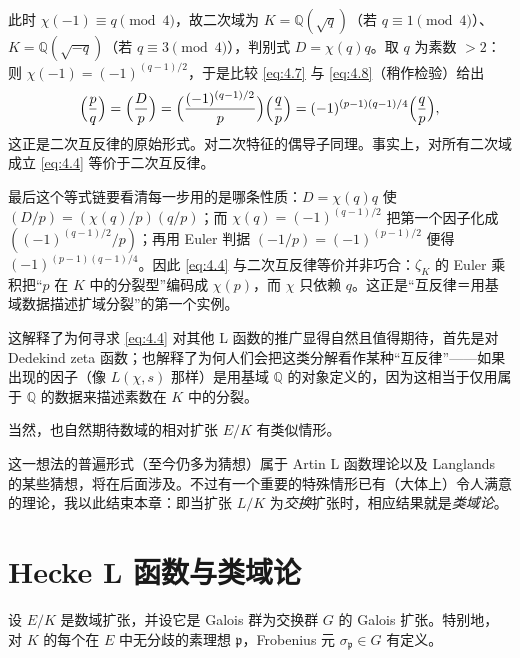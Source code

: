 此时 $\chi(-1)\equiv q\pmod 4$，故二次域为 $K=\mathbb{Q}(\sqrt{q})$（若 $q\equiv 1\pmod 4$）、$K=\mathbb{Q}(\sqrt{-q})$（若 $q\equiv 3\pmod 4$），判别式 $D=\chi(q)q$。取 $q$ 为素数 $>2$：则 $\chi(-1)=(-1)^{(q-1)/2}$，于是比较 \eqref{eq:4.7} 与 \eqref{eq:4.8}（稍作检验）给出
\[
\Bigl(\frac{p}{q}\Bigr)=\Bigl(\frac{D}{p}\Bigr)
=\Bigl(\frac{(-1)^{(q-1)/2}}{p}\Bigr)\Bigl(\frac{q}{p}\Bigr)
=(-1)^{(p-1)(q-1)/4}\Bigl(\frac{q}{p}\Bigr),
\]
这正是二次互反律的原始形式。对二次特征的偶导子同理。事实上，对所有二次域成立 \eqref{eq:4.4} 等价于二次互反律。

\begin{annote}
最后这个等式链要看清每一步用的是哪条性质：$D=\chi(q)q$ 使 $(D/p)=(\chi(q)/p)(q/p)$；而 $\chi(q)=(-1)^{(q-1)/2}$ 把第一个因子化成 $((-1)^{(q-1)/2}/p)$；再用 Euler 判据 $(-1/p)=(-1)^{(p-1)/2}$ 便得 $(-1)^{(p-1)(q-1)/4}$。因此 \eqref{eq:4.4} 与二次互反律等价并非巧合：$\zeta_K$ 的 Euler 乘积把“$p$ 在 $K$ 中的分裂型”编码成 $\chi(p)$，而 $\chi$ 只依赖 $q$。这正是“互反律＝用基域数据描述扩域分裂”的第一个实例。
\par\vspace{0.15em}{\raggedleft 【来源：Gauss《Disquisitiones Arithmeticae》Art.~131--152（A）；Neukirch《Algebraic Number Theory》Ch.~I 二次互反律一节（A）】\par}
\end{annote}

这解释了为何寻求 \eqref{eq:4.4} 对其他 L 函数的推广显得自然且值得期待，首先是对 Dedekind zeta 函数；也解释了为何人们会把这类分解看作某种“互反律”——如果出现的因子（像 $L(\chi,s)$ 那样）是用基域 $\mathbb{Q}$ 的对象定义的，因为这相当于仅用属于 $\mathbb{Q}$ 的数据来描述素数在 $K$ 中的分裂。

当然，也自然期待数域的相对扩张 $E/K$ 有类似情形。

这一想法的普遍形式（至今仍多为猜想）属于 Artin L 函数理论以及 Langlands 的某些猜想，将在后面涉及。不过有一个重要的特殊情形已有（大体上）令人满意的理论，我以此结束本章：即当扩张 $L/K$ 为\emph{交换}扩张时，相应结果就是\emph{类域论}。

\section{Hecke L 函数与类域论}\label{sec:5}

设 $E/K$ 是数域扩张，并设它是 Galois 群为交换群 $G$ 的 Galois 扩张。特别地，对 $K$ 的每个在 $E$ 中无分歧的素理想 $\mathfrak{p}$，Frobenius 元 $\sigma_{\mathfrak{p}}\in G$ 有定义。


